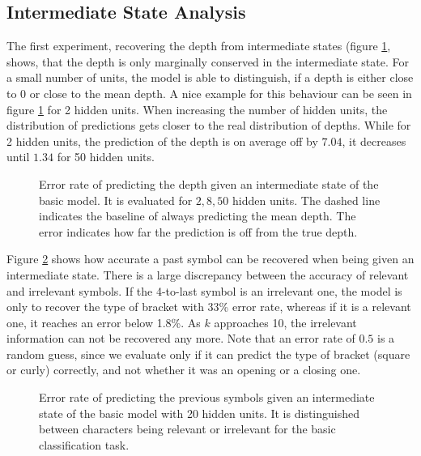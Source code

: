 \documentclass[11pt,a4paper]{article}
\newlength\figureheight
\newlength\figurewidth
\begin{document}
\subsection{Intermediate State Analysis}
\label{subsec:intermediate_state_analysis}

The first experiment, recovering the depth from intermediate states (figure \ref{fig:analysis_depth_results}, shows, that the depth is only marginally conserved in the intermediate state. For a small number of units, the model is able to distinguish, if a depth is either close to $0$ or close to the mean depth. A nice example for this behaviour can be seen in figure \ref{fig:analysis_depth_results} for 2 hidden units. When increasing the number of hidden units, the distribution of predictions gets closer to the real distribution of depths. While for 2 hidden units, the prediction of the depth is on average off by $7.04$, it decreases until $1.34$ for 50 hidden units.

\setlength\figureheight{6cm}
\setlength{}
\begin{figure}[ht]
    \caption{Error rate of predicting the depth given an intermediate state of the basic model. It is evaluated for $2,8,50$ hidden units. The dashed line indicates the baseline of always predicting the mean depth. The error indicates how far the prediction is off from the true depth.}%
    \label{fig:analysis_depth_results}%
\end{figure}

Figure \ref{fig:analysis_previous_results} shows how accurate a past symbol can be recovered when being given an intermediate state. There is a large discrepancy between the accuracy of relevant and irrelevant symbols. If the 4-to-last symbol is an irrelevant one, the model is only to recover the type of bracket with 33\% error rate, whereas if it is a relevant one, it reaches an error below 1.8\%. As $k$ approaches 10, the irrelevant information can not be recovered any more. Note that an error rate of $0.5$ is a random guess, since we evaluate only if it can predict the type of bracket (square or curly) correctly, and not whether it was an opening or a closing one.

\setlength\figureheight{4cm}
\setlength\figurewidth{\linewidth}
\begin{figure}[ht]
    \caption{Error rate of predicting the previous symbols given an intermediate state of the basic model with 20 hidden units. It is distinguished between characters being relevant or irrelevant for the basic classification task.}%
    \label{fig:analysis_previous_results}%
\end{figure}
\end{document}
